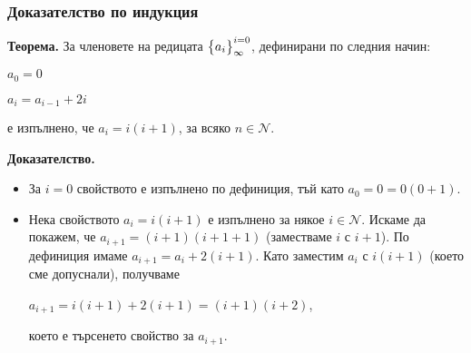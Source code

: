 \documentclass{beamer}
\begin{document}
\begin{frame}[fragile]
\frametitle{Доказателство по индукция}

\begin{flushleft}
\textbf{Теорема.} За членовете на редицата $\big{\{}a_i\big{\}}_\infty^{i=0}$, дефинирани по следния начин:

\vspace{10px}
$a_0 = 0$

$a_i = a_{i-1} + 2i$
\vspace{10px}

е изпълнено, че $a_i=i(i+1)$, за всяко $n \in \mathcal{N}$.

\vspace{10px}


\textbf{Доказателство.} 

\begin{itemize}
  \item За $i=0$ свойството е изпълнено по дефиниция, тъй като $a_0=0=0(0+1)$.
  \item Нека свойството $a_i=i(i+1)$ е изпълнено за някое $i \in \mathcal{N}$. Искаме да покажем, че $a_{i+1}=(i+1)(i+1+1)$ (заместваме $i$ с $i+1$). По дефиниция имаме $a_{i+1} = a_i + 2(i+1)$. Като заместим $a_i$ с $i(i+1)$ (което сме допуснали), получваме  

  $a_{i+1} = i(i+1) + 2(i+1) = (i+1)(i+2) $,

  което е търсенето свойство за $a_{i+1}$.
\end{itemize}

\end{flushleft}


\end{frame}
\end{document}
